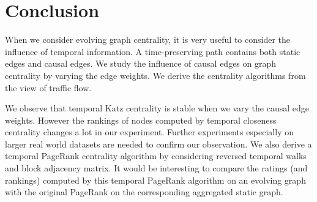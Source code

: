 \documentclass[12pt]{article}
\theoremstyle{definition}
\begin{document}
\section{Conclusion}
\label{sec:conclusion}

When we consider evolving graph centrality, it is very useful to
consider the influence of temporal information.
A time-preserving path contains both static edges and causal edges.
We study the influence of causal edges on graph centrality by varying
the edge weights. We derive the centrality algorithms from the view of traffic flow.

We observe that temporal Katz centrality is stable when we vary the causal edge weights. However the rankings of nodes computed by temporal closeness centrality changes a lot in our experiment.
Further experiments especially on larger real world datasets are needed to confirm our observation. We also derive a temporal PageRank centrality algorithm by considering reversed temporal walks and block adjacency matrix. It would be interesting to compare the ratings (and rankings) computed by this temporal PageRank algorithm on an evolving graph with the original PageRank on the corresponding aggregated static graph.



\end{document}
